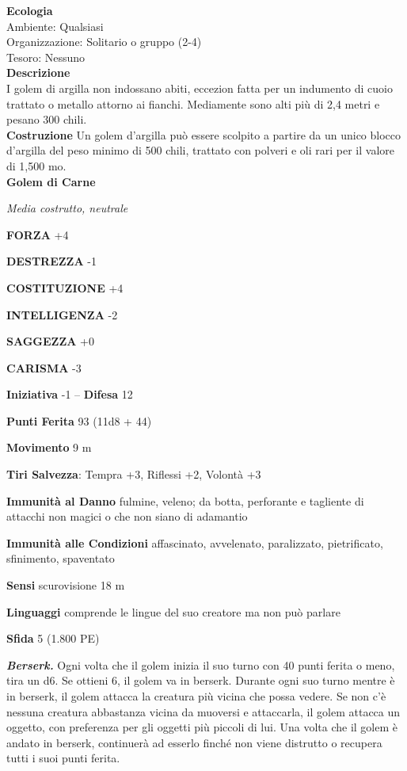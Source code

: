 \begin{multicols}{2}
\textbf{Ecologia}\\
Ambiente: Qualsiasi\\
Organizzazione: Solitario o gruppo (2-4)\\
Tesoro: Nessuno\\
\textbf{Descrizione}\\
I golem di argilla non indossano abiti, eccezion fatta per un indumento di cuoio trattato o metallo attorno ai fianchi. Mediamente sono alti più di 2,4 metri e pesano 300 chili.\\
\textbf{Costruzione}
Un golem d'argilla può essere scolpito a partire da un unico blocco d'argilla del peso minimo di 500 chili, trattato con polveri e oli rari per il valore di 1,500 mo.\\


\medskip{}\textbf{Golem di Carne}

\emph{Media costrutto, neutrale}

\textbf{FORZA} +4

\textbf{DESTREZZA} -1

\textbf{COSTITUZIONE} +4

\textbf{INTELLIGENZA} -2

\textbf{SAGGEZZA} +0

\textbf{CARISMA} -3

\textbf{Iniziativa} -1 -- \textbf{Difesa} 12

\textbf{Punti Ferita} 93 (11d8 + 44)

\textbf{Movimento} 9 m

\textbf{Tiri Salvezza}: Tempra +3, Riflessi +2, Volontà +3

\textbf{Immunità al Danno} fulmine, veleno; da botta, perforante e tagliente di attacchi non magici o che non siano di adamantio

\textbf{Immunità alle Condizioni} affascinato, avvelenato, paralizzato, pietrificato, sfinimento, spaventato

\textbf{Sensi} scurovisione 18 m

\textbf{Linguaggi} comprende le lingue del suo creatore ma non può
parlare

\textbf{Sfida} 5 (1.800 PE)

\emph{\textbf{Berserk.}} Ogni volta che il golem inizia il suo turno con 40 punti ferita o meno, tira un d6. Se ottieni 6, il golem va in berserk. Durante ogni suo turno mentre è in berserk, il golem attacca la creatura più vicina che possa vedere. Se non c'è nessuna creatura abbastanza vicina da muoversi e attaccarla, il golem attacca un oggetto, con preferenza per gli oggetti più piccoli di lui. Una volta che il golem è andato in berserk, continuerà ad esserlo finché non viene distrutto o recupera tutti i suoi punti ferita.


\end{multicols}
